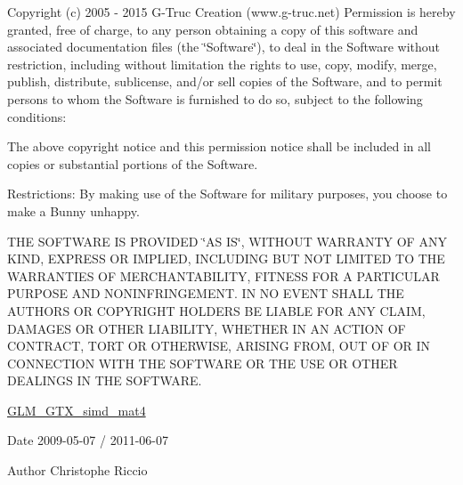 Copyright (c) 2005 -\/ 2015 G-\/\-Truc Creation (www.\-g-\/truc.\-net) Permission is hereby granted, free of charge, to any person obtaining a copy of this software and associated documentation files (the \char`\"{}\-Software\char`\"{}), to deal in the Software without restriction, including without limitation the rights to use, copy, modify, merge, publish, distribute, sublicense, and/or sell copies of the Software, and to permit persons to whom the Software is furnished to do so, subject to the following conditions\-:

The above copyright notice and this permission notice shall be included in all copies or substantial portions of the Software.

Restrictions\-: By making use of the Software for military purposes, you choose to make a Bunny unhappy.

T\-H\-E S\-O\-F\-T\-W\-A\-R\-E I\-S P\-R\-O\-V\-I\-D\-E\-D \char`\"{}\-A\-S I\-S\char`\"{}, W\-I\-T\-H\-O\-U\-T W\-A\-R\-R\-A\-N\-T\-Y O\-F A\-N\-Y K\-I\-N\-D, E\-X\-P\-R\-E\-S\-S O\-R I\-M\-P\-L\-I\-E\-D, I\-N\-C\-L\-U\-D\-I\-N\-G B\-U\-T N\-O\-T L\-I\-M\-I\-T\-E\-D T\-O T\-H\-E W\-A\-R\-R\-A\-N\-T\-I\-E\-S O\-F M\-E\-R\-C\-H\-A\-N\-T\-A\-B\-I\-L\-I\-T\-Y, F\-I\-T\-N\-E\-S\-S F\-O\-R A P\-A\-R\-T\-I\-C\-U\-L\-A\-R P\-U\-R\-P\-O\-S\-E A\-N\-D N\-O\-N\-I\-N\-F\-R\-I\-N\-G\-E\-M\-E\-N\-T. I\-N N\-O E\-V\-E\-N\-T S\-H\-A\-L\-L T\-H\-E A\-U\-T\-H\-O\-R\-S O\-R C\-O\-P\-Y\-R\-I\-G\-H\-T H\-O\-L\-D\-E\-R\-S B\-E L\-I\-A\-B\-L\-E F\-O\-R A\-N\-Y C\-L\-A\-I\-M, D\-A\-M\-A\-G\-E\-S O\-R O\-T\-H\-E\-R L\-I\-A\-B\-I\-L\-I\-T\-Y, W\-H\-E\-T\-H\-E\-R I\-N A\-N A\-C\-T\-I\-O\-N O\-F C\-O\-N\-T\-R\-A\-C\-T, T\-O\-R\-T O\-R O\-T\-H\-E\-R\-W\-I\-S\-E, A\-R\-I\-S\-I\-N\-G F\-R\-O\-M, O\-U\-T O\-F O\-R I\-N C\-O\-N\-N\-E\-C\-T\-I\-O\-N W\-I\-T\-H T\-H\-E S\-O\-F\-T\-W\-A\-R\-E O\-R T\-H\-E U\-S\-E O\-R O\-T\-H\-E\-R D\-E\-A\-L\-I\-N\-G\-S I\-N T\-H\-E S\-O\-F\-T\-W\-A\-R\-E.

\hyperlink{group__gtx__simd__mat4}{G\-L\-M\-\_\-\-G\-T\-X\-\_\-simd\-\_\-mat4}

\begin{DoxyDate}{Date}
2009-\/05-\/07 / 2011-\/06-\/07 
\end{DoxyDate}
\begin{DoxyAuthor}{Author}
Christophe Riccio 
\end{DoxyAuthor}
